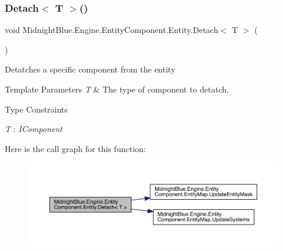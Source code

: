 \subsubsection{\texorpdfstring{Detach$<$ T $>$()}{Detach< T >()}}
{\footnotesize\ttfamily void Midnight\+Blue.\+Engine.\+Entity\+Component.\+Entity.\+Detach$<$ T $>$ (\begin{DoxyParamCaption}{ }\end{DoxyParamCaption})\hspace{0.3cm}{\ttfamily [inline]}}



Detatches a specific component from the entity 


\begin{DoxyTemplParams}{Template Parameters}
{\em T} & The type of component to detatch.\\
\hline
\end{DoxyTemplParams}
\begin{Desc}
\item[Type Constraints]\begin{description}
\item[{\em T} : {\em I\+Component}]\end{description}
\end{Desc}
Here is the call graph for this function\+:
\nopagebreak
\begin{figure}[H]
\begin{center}
\leavevmode
\includegraphics[width=350pt]{class_midnight_blue_1_1_engine_1_1_entity_component_1_1_entity_ab5b2a5d043014c5c4b3e97562df9f76a_cgraph}
\end{center}
\end{figure}
\hypertarget{class_midnight_blue_1_1_engine_1_1_entity_component_1_1_entity_a2109f26da3d9f33ff2ab950498e87782}{}\label{class_midnight_blue_1_1_engine_1_1_entity_component_1_1_entity_a2109f26da3d9f33ff2ab950498e87782} 
